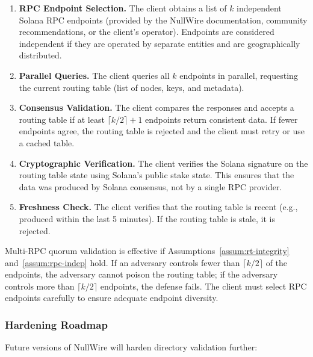 \documentclass[11pt]{article}
\theoremstyle{definition}
\theoremstyle{remark}
\begin{document}
\begin{enumerate}
    \item \textbf{RPC Endpoint Selection.} The client obtains a list of $k$ independent Solana RPC endpoints (provided by the NullWire documentation, community recommendations, or the client's operator). Endpoints are considered independent if they are operated by separate entities and are geographically distributed.

    \item \textbf{Parallel Queries.} The client queries all $k$ endpoints in parallel, requesting the current routing table (list of nodes, keys, and metadata).

    \item \textbf{Consensus Validation.} The client compares the responses and accepts a routing table if at least $\lceil k/2 \rceil + 1$ endpoints return consistent data. If fewer endpoints agree, the routing table is rejected and the client must retry or use a cached table.

    \item \textbf{Cryptographic Verification.} The client verifies the Solana signature on the routing table state using Solana's public stake state. This ensures that the data was produced by Solana consensus, not by a single RPC provider.

    \item \textbf{Freshness Check.} The client verifies that the routing table is recent (e.g., produced within the last 5 minutes). If the routing table is stale, it is rejected.
\end{enumerate}

Multi-RPC quorum validation is effective if Assumptions~\ref{assum:rt-integrity} and~\ref{assum:rpc-indep} hold. If an adversary controls fewer than $\lceil k/2 \rceil$ of the endpoints, the adversary cannot poison the routing table; if the adversary controls more than $\lceil k/2 \rceil$ endpoints, the defense fails. The client must select RPC endpoints carefully to ensure adequate endpoint diversity.

\subsubsection{Hardening Roadmap}

Future versions of NullWire will harden directory validation further:
\end{document}
